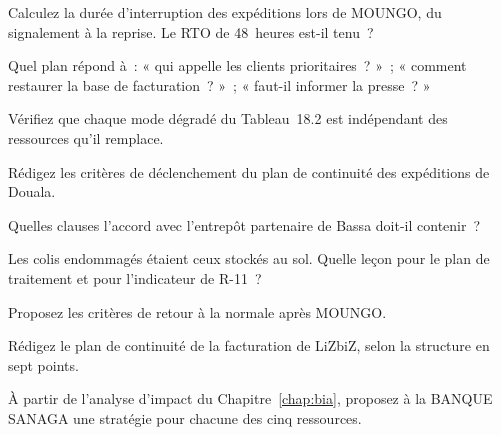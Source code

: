 \begin{boxexo}[title={\ding{45}\quad Exercice~18.2. Le RTO tenu \niveaubase}]
Calculez la durée d'interruption des expéditions lors de MOUNGO, du
signalement à la reprise. Le RTO de 48~heures est-il tenu~?
\end{boxexo}

\begin{boxexo}[title={\ding{45}\quad Exercice~18.3. Quel plan~? \niveaubase}]
Quel plan répond à~: « qui appelle les clients prioritaires~? »~;
« comment restaurer la base de facturation~? »~; « faut-il informer la
presse~? »
\end{boxexo}

\begin{boxexo}[title={\ding{45}\quad Exercice~18.4. Indépendance \niveaumoyen}]
Vérifiez que chaque mode dégradé du Tableau~18.2 est indépendant des
ressources qu'il remplace.
\end{boxexo}

\begin{boxexo}[title={\ding{45}\quad Exercice~18.5. Déclenchement \niveaumoyen}]
Rédigez les critères de déclenchement du plan de continuité des
expéditions de Douala.
\end{boxexo}

\begin{boxexo}[title={\ding{45}\quad Exercice~18.6. L'accord de repli \niveaumoyen}]
Quelles clauses l'accord avec l'entrepôt partenaire de Bassa doit-il
contenir~?
\end{boxexo}

\begin{boxexo}[title={\ding{45}\quad Exercice~18.7. Les colis au sol \niveaumoyen}]
Les colis endommagés étaient ceux stockés au sol. Quelle leçon pour le
plan de traitement et pour l'indicateur de R-11~?
\end{boxexo}

\begin{boxexo}[title={\ding{45}\quad Exercice~18.8. Fin de crise \niveaumoyen}]
Proposez les critères de retour à la normale après MOUNGO.
\end{boxexo}

\begin{boxexo}[title={\ding{45}\quad Exercice~18.9. Un plan complet \niveauexpert}]
Rédigez le plan de continuité de la facturation de LiZbiZ, selon la
structure en sept points.
\end{boxexo}

\begin{boxexo}[title={\ding{45}\quad Exercice~18.10. Stratégie bancaire \niveauexpert}]
À partir de l'analyse d'impact du Chapitre~\ref{chap:bia}, proposez à la
BANQUE SANAGA une stratégie pour chacune des cinq ressources.
\end{boxexo}

